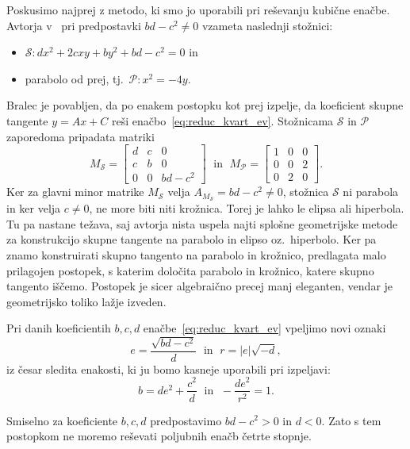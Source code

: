 Poskusimo najprej z metodo, ki smo jo uporabili pri reševanju kubične enačbe. Avtorja v~\cite[str.\ 22]{edwards2001} pri predpostavki $bd - c^2 \neq 0$ vzameta naslednji stožnici:
\begin{itemize}
    \item $\mathcal{S}: dx^2 + 2cxy + by^2 + bd - c^2 = 0$ in
    \item parabolo od prej, tj.\ $\mathcal{P}: x^2 = -4y$.
\end{itemize}
Bralec je povabljen, da po enakem postopku kot prej izpelje, da koeficient skupne tangente $y = Ax + C$ reši enačbo~\eqref{eq:reduc_kvart_ev}. Stožnicama $\mathcal{S}$ in $\mathcal{P}$ zaporedoma pripadata matriki
$$ M_\mathcal{S} =
    \begin{bmatrix}
        d & c & 0\\
        c & b & 0\\
        0 & 0 & bd - c^2
    \end{bmatrix}
    \; \text{ in } \; M_\mathcal{P} =
    \begin{bmatrix}
        1 & 0 & 0\\
        0 & 0 & 2\\
        0 & 2 & 0
    \end{bmatrix}.
$$
Ker za glavni minor matrike $M_\mathcal{S}$ velja $A_{M_\mathcal{S}} = bd - c^2 \neq 0$, stožnica $\mathcal{S}$ ni parabola in ker velja $c \neq 0$, ne more biti niti krožnica. Torej je lahko le elipsa ali hiperbola. Tu pa nastane težava, saj avtorja nista uspela najti splošne geometrijske metode za konstrukcijo skupne tangente na parabolo in elipso oz.\ hiperbolo. Ker pa znamo konstruirati skupno tangento na parabolo in krožnico, predlagata malo prilagojen postopek, s katerim določita parabolo in krožnico, katere skupno tangento iščemo. Postopek je sicer algebraično precej manj eleganten, vendar je geometrijsko toliko lažje izveden.

Pri danih koeficientih $b, c, d$ enačbe~\eqref{eq:reduc_kvart_ev} vpeljimo novi oznaki
$$ e = \frac{\sqrt{bd - c^2}}{d} \; \text{ in } \; r = |e|\sqrt{-d}, $$
iz česar sledita enakosti, ki ju bomo kasneje uporabili pri izpeljavi:
\begin{equation}
    \label{eq:kvarticni_enakosti}
    b= de^2 + \frac{c^2}{d} \; \text{ in } \; -\frac{de^2}{r^2} = 1.
\end{equation}
\begin{opomba}
    Smiselno za koeficiente $b, c, d$ predpostavimo $bd - c^2 > 0$ in $d < 0$. Zato s tem postopkom ne moremo reševati poljubnih enačb četrte stopnje.
\end{opomba}

